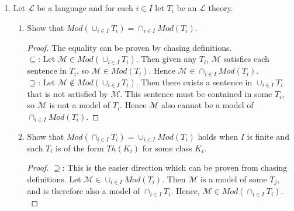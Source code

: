 \documentclass{article}
\begin{document}
\begin{enumerate}
    \begin{proof}
      We apply the Tarski-Vaught test. Let $\varphi(x_1,\ldots,x_n,y)$ be a
      formula and $a_1,\ldots,a_n\in M$ such that
      $\mathcal{N}\models\varphi(a_1,\ldots,a_n,b)$ for some $b\in N$. Now
      each $a_i$ is contained in $M_{i_j}$ for some $i_j\in I$. Let $k\in
      I$ be the maximal of all these $i_j$'s. Then $a_1,\ldots,a_n\in M_k$,
      and since $\mathcal{M}_k\preceq\mathcal{N}$, there exists some $c\in
      M_k$, such that $\mathcal{M}_k\models\varphi(a_1,\ldots,a_n,c)$. Then
      from Tarski's Chain Lemma which we have proven in the previous
      question, $\mathcal{M}_k\preceq\mathcal{M}$, and so
      $\mathcal{M}\models\varphi(a_1,\ldots,a_n,c)$ for some $c\in M$. Hence
      $\mathcal{M}\preceq\mathcal{N}$ by the Tarski-Vaught test.
    \end{proof}

  \item Let $\mathcal{L}$ be a language and for each $i\in I$ let $T_i$ be
    an $\mathcal{L}$ theory.
    \begin{enumerate}
      \item Show that $Mod(\cup_{i\in I}T_i)=\cap_{i\in I}Mod(T_i)$.
        \begin{proof}
          The equality can be proven by chasing definitions. \\

          $\subseteq$: Let $\mathcal{M}\in Mod(\cup_{i\in I}T_i)$. Then
          given any $T_i$, $\mathcal{M}$ satisfies each sentence in $T_i$,
          so $\mathcal{M}\in Mod(T_i)$. Hence $\mathcal{M}\in \cap_{i\in
          I}Mod(T_i)$. \\

          $\supseteq$: Let $\mathcal{M}\not\in Mod(\cup_{i\in I}T_i)$.
          Then there exists a sentence in $\cup_{i\in I}T_i$ that is
          not satisfied by $\mathcal{M}$. This sentence must be contained
          in some $T_i$, so $\mathcal{M}$ is not a model of $T_i$. Hence
          $\mathcal{M}$ also cannot be a model of $\cap_{i\in I}Mod(T_i)$.
        \end{proof}

      \item Show that $Mod(\cap_{i\in I}T_i)=\cup_{i\in I}Mod(T_i)$ holds
        when $I$ is finite and each $T_i$ is of the form $Th(K_i)$ for some
        class $K_i$.

        \begin{proof}
          $\supseteq$: This is the easier direction which can be proven
          from chasing definitions. Let $\mathcal{M}\in \cup_{i\in
          I}Mod(T_i)$. Then $\mathcal{M}$ is a model of some $T_j$, and is
          therefore also a model of $\cap_{i\in I}T_i$. Hence,
          $\mathcal{M}\in Mod(\cap_{i\in I}T_i)$. \\


\end{proof}
\end{enumerate}
\end{enumerate}
\end{document}
